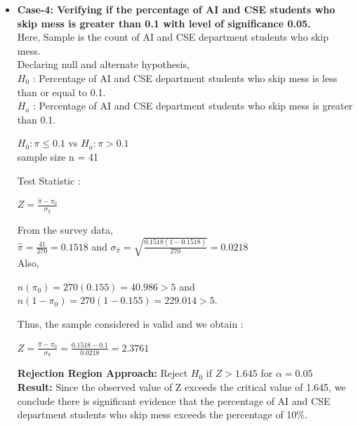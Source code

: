 \documentclass{article}
\begin{document}
\begin{itemize}
\item{\textbf{Case-4: Verifying if the percentage of AI and CSE students who skip mess is greater than 0.1 with level of significance 0.05.}}\\
Here, Sample is the count of AI and CSE department students who skip mess.\\
Declaring null and alternate hypothesis,\\
$H_0$ : Percentage of AI and CSE department students who skip mess is less than or equal to 0.1.\\
$H_a$ : Percentage of AI and CSE department students who skip mess is greater than 0.1.
\begin{center}
$H_0 : \pi \leq 0.1$ vs $H_a : \pi > 0.1$\\
sample size n = 41
\end{center}
Test Statistic :
\begin{center}
$Z = \frac{\hat{\pi}-{\pi_0}}{\sigma_{\hat{\pi}}}$
\end{center}
From the survey data,\\
$\hat{\pi} = \frac{41}{270} = 0.1518$ and $\sigma_{\hat{\pi}} = \sqrt{\frac{0.1518(1-0.1518)}{270}} = 0.0218$\\
Also, 
\begin{center}
$n(\pi_0) = 270(0.155) = 40.986 > 5$ and $n(1-\pi_0) = 270(1-0.155) = 229.014 > 5.$
\end{center}
Thus, the sample considered is valid and we obtain :
\begin{center}
$Z = \frac{\hat{\pi}-{\pi_0}}{\sigma_{\hat{\pi}}} = \frac{0.1518-0.1}{0.0218} = 2.3761$
\end{center}
\textbf{Rejection Region Approach:}
Reject $H_0$ if $Z>1.645$ for $\alpha = 0.05$\\
\textbf{Result:}
Since the observed value of Z exceeds the critical value of
1.645, we conclude there is significant evidence that the
percentage of AI and CSE department students who skip mess exceeds the percentage of 10\%.

\end{itemize}
\end{document}
